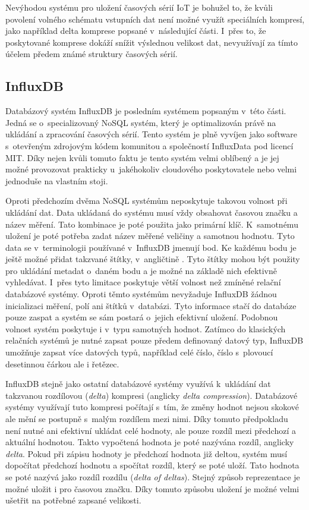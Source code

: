 Nevýhodou systému pro uložení časových sérií IoT je bohužel to, že kvůli povolení volného schématu vstupních dat není možné využít speciálních kompresí, jako například delta komprese popsané v~následující části. I~přes to, že poskytované komprese dokáží snížit výslednou velikost dat, nevyužívají za tímto účelem předem známé struktury časových sérií.

\subsection{InfluxDB}
Databázový systém InfluxDB je posledním systémem popsaným v~této části. Jedná se o~specializovaný NoSQL systém, který je optimalizován právě na ukládání a zpracování časových sérií. Tento systém je plně vyvíjen jako software s~otevřeným zdrojovým kódem komunitou a společností InfluxData pod licencí MIT. Díky nejen kvůli tomuto faktu je tento systém velmi oblíbený a je jej možné provozovat prakticky u~jakéhokoliv cloudového poskytovatele nebo velmi jednoduše na vlastním stoji.

Oproti předchozím dvěma NoSQL systémům neposkytuje takovou volnost při ukládání dat. Data ukládaná do systému musí vždy obsahovat časovou značku a název měření. Tato kombinace je poté použita jako primární klíč. K~samotnému uložení je poté potřeba zadat název měřené veličiny a samotnou hodnotu. Tyto data se v~terminologii používané v~InfluxDB jmenují bod. Ke každému bodu je ještě možné přidat takzvané štítky, v~angličtině . Tyto štítky mohou být použity pro ukládání metadat o~daném bodu a je možné na základě nich efektivně vyhledávat. I~přes tyto limitace poskytuje větší volnost než zmíněné relační databázové systémy. Oproti těmto systémům nevyžaduje InfluxDB žádnou inicializaci měření, polí ani štítků v~databázi. Tyto informace stačí do databáze pouze zaspat a systém se sám postará o~jejich efektivní uložení. Podobnou volnost systém poskytuje i v~typu samotných hodnot. Zatímco do klasických relačních systémů je nutné zapsat pouze předem definovaný datový typ, InfluxDB umožňuje zapsat více datových typů, například celé číslo, číslo s~plovoucí desetinnou čárkou ale i řetězec.

InfluxDB stejně jako ostatní databázové systémy využívá k~ukládání dat takzvanou rozdílovou (\textit{delta}) kompresi (anglicky \textit{delta compression}). Databázové systémy využívají tuto kompresi počítají s~tím, že změny hodnot nejsou skokové ale mění se postupně s~malým rozdílem mezi nimi. Díky tomuto předpokladu není nutné ani efektivní ukládat celé hodnoty, ale pouze rozdíl mezi předchozí a aktuální hodnotou. Takto vypočtená hodnota je poté nazývána rozdíl, anglicky \textit{delta}. Pokud při zápisu hodnoty je předchozí hodnota již deltou, systém musí dopočítat předchozí hodnotu a spočítat rozdíl, který se poté uloží. Tato hodnota se poté nazývá jako rozdíl rozdílu (\textit{delta of deltas}). Stejný způsob reprezentace je možné uložit i pro časovou značku. Díky tomuto způsobu uložení je možné velmi ušetřit na potřebné zapsané velikosti.

